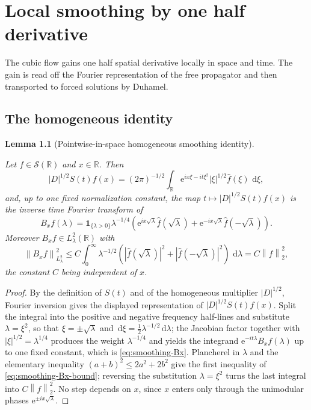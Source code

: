 \documentclass[11pt,oneside]{book}
\providecommand{\uses}[1]{}
\newtheorem{lemma}[theorem]{Lemma}
\theoremstyle{definition}
\theoremstyle{remark}
\newcommand{\R}{\mathbb R}
\newcommand{\Ssch}{\mathcal S}
\newcommand{\1}{\mathbf 1}
\newcommand{\dd}{\,\mathrm d}
\newcommand{\norm}[1]{\left\lVert #1\right\rVert}
\newcommand{\e}{\mathrm e}
\begin{document}
\chapter{Local smoothing by one half derivative}\label{chap:smoothing}

The cubic flow gains one half spatial derivative locally in space and time.
The gain is read off the Fourier representation of the free propagator and
then transported to forced solutions by Duhamel.

\section{The homogeneous identity}

\begin{lemma}[Pointwise-in-space homogeneous smoothing identity]\label{lem:homogeneous-smoothing-identity}
\uses{def:propagator, def:homogeneous-multiplier, def:Hs-space}
Let $f\in\Ssch(\R)$ and $x\in\R$. Then
\[
 |D|^{1/2}S(t)f(x)
 =(2\pi)^{-1/2}\int_\R
    \e^{ix\xi-it\xi^2}|\xi|^{1/2}\widehat f(\xi)\,\dd\xi ,
\]
and, up to one fixed normalization constant, the map $t\mapsto|D|^{1/2}S(t)f(x)$
is the inverse time Fourier transform of
\begin{equation}
 B_xf(\lambda)=\1_{\{\lambda>0\}}\lambda^{-1/4}
 \left(\e^{ix\sqrt\lambda}\widehat f(\sqrt\lambda)
      +\e^{-ix\sqrt\lambda}\widehat f(-\sqrt\lambda)\right).
 \label{eq:smoothing-Bx}
\end{equation}
Moreover $B_xf\in L^2_\lambda(\R)$ with
\begin{equation}
 \norm{B_xf}_{L^2_\lambda}^2
 \le C\int_0^\infty \lambda^{-1/2}
 \left(|\widehat f(\sqrt\lambda)|^2
      +|\widehat f(-\sqrt\lambda)|^2\right)\,\dd\lambda
 =C\norm f_2^2,
 \label{eq:smoothing-Bx-bound}
\end{equation}
the constant $C$ being independent of $x$.
\end{lemma}

\begin{proof}
\uses{def:propagator, def:homogeneous-multiplier}
By the definition of $S(t)$ and of the homogeneous multiplier $|D|^{1/2}$,
Fourier inversion gives the displayed representation of $|D|^{1/2}S(t)f(x)$.
Split the integral into the positive and negative frequency half-lines and
substitute $\lambda=\xi^2$, so that $\xi=\pm\sqrt\lambda$ and
$\dd\xi=\tfrac12\lambda^{-1/2}\dd\lambda$; the Jacobian factor together with
$|\xi|^{1/2}=\lambda^{1/4}$ produces the weight $\lambda^{-1/4}$ and yields the
integrand $\e^{-it\lambda}B_xf(\lambda)$ up to one fixed constant, which is
\eqref{eq:smoothing-Bx}. Plancherel in $\lambda$ and the elementary inequality
$(a+b)^2\le 2a^2+2b^2$ give the first inequality of
\eqref{eq:smoothing-Bx-bound}; reversing the substitution $\lambda=\xi^2$ turns
the last integral into $C\norm f_2^2$. No step depends on $x$, since $x$ enters
only through the unimodular phases $\e^{\pm ix\sqrt\lambda}$.
\end{proof}
\end{document}
